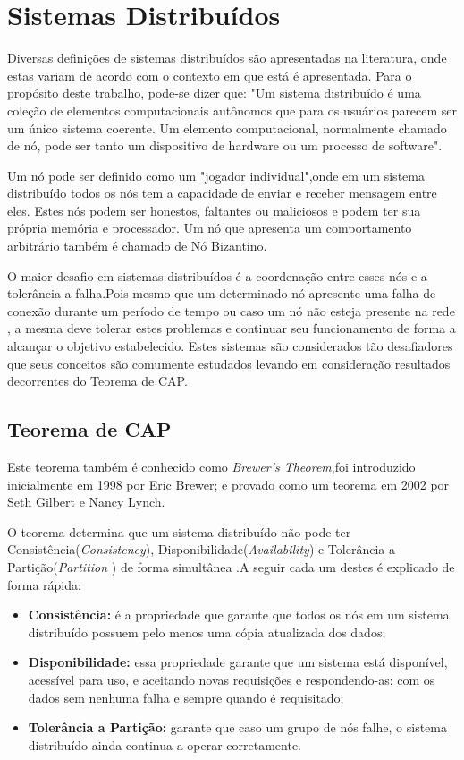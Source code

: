 \section{Sistemas Distribuídos}

    Diversas definições de sistemas distribuídos são apresentadas na literatura, onde estas variam de acordo com o contexto em que está é apresentada. Para o propósito deste trabalho, pode-se dizer que: "Um sistema distribuído é uma coleção de elementos computacionais autônomos que para os usuários parecem ser um único sistema coerente. Um elemento computacional, normalmente chamado de nó, pode ser tanto um dispositivo de hardware ou um processo de software"\cite{sistemas_distribuidos_tanembaum}.

    Um nó pode ser definido como um "jogador individual",onde em um sistema distribuído todos os nós tem a capacidade de enviar e receber mensagem entre eles. Estes nós podem ser honestos, faltantes ou maliciosos e podem ter sua própria memória e processador. Um nó que apresenta um comportamento arbitrário também é chamado de Nó Bizantino.\cite{mastering_blockchain}

    O maior desafio em sistemas distribuídos é a coordenação entre esses nós e a tolerância a falha.Pois mesmo que um determinado nó apresente uma falha de conexão durante um período de tempo
    ou caso um nó não esteja presente na rede , a mesma deve tolerar estes problemas e continuar seu funcionamento de forma a alcançar o objetivo estabelecido. Estes sistemas 
    são considerados tão desafiadores que seus conceitos são comumente estudados levando em consideração resultados decorrentes do Teorema de CAP.

    \subsection{Teorema de CAP}

        Este teorema também é conhecido como \textit{Brewer's Theorem},foi introduzido inicialmente em 1998 por Eric Brewer; e provado como um teorema em 2002 por Seth Gilbert e Nancy Lynch.

        O teorema determina que um sistema distribuído não pode ter Consistência(\textit{Consistency}), Disponibilidade(\textit{Availability}) e Tolerância a Partição(\textit{Partition} ) de forma simultânea \cite{brewer_distributed}.A seguir cada um destes é explicado de forma rápida:

        \begin{itemize}
            \item \textbf{Consistência:} é a propriedade que garante que todos os nós em um sistema distribuído possuem pelo menos uma cópia atualizada dos dados;
            \item \textbf{Disponibilidade:} essa propriedade garante que um sistema está disponível, acessível para uso, e aceitando novas requisições e respondendo-as;
        com os dados sem nenhuma falha e sempre quando é requisitado;
            \item \textbf{Tolerância a Partição:} garante que caso um grupo de nós falhe, o sistema distribuído ainda continua a operar corretamente.
        \end{itemize}

